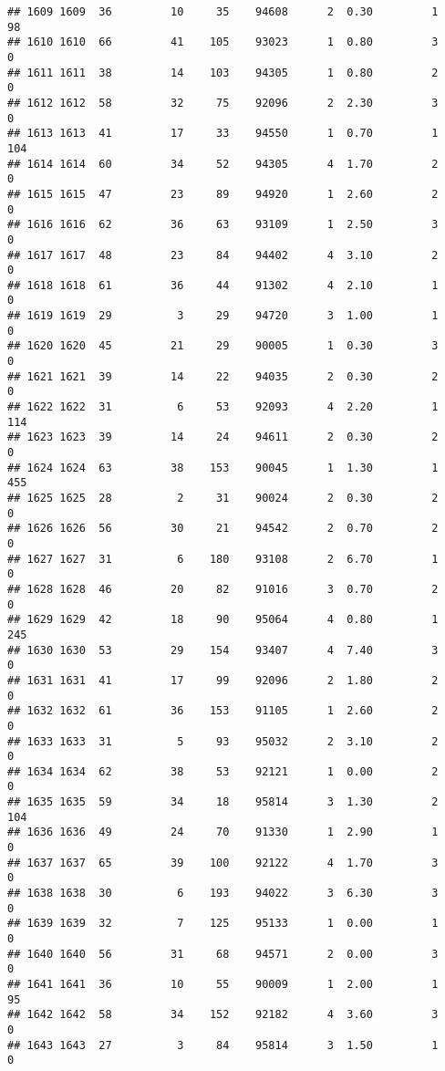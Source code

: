 \documentclass[
]{article}
\begin{document}
\begin{verbatim}
## 1609 1609  36         10     35    94608      2  0.30         1       98
## 1610 1610  66         41    105    93023      1  0.80         3        0
## 1611 1611  38         14    103    94305      1  0.80         2        0
## 1612 1612  58         32     75    92096      2  2.30         3        0
## 1613 1613  41         17     33    94550      1  0.70         1      104
## 1614 1614  60         34     52    94305      4  1.70         2        0
## 1615 1615  47         23     89    94920      1  2.60         2        0
## 1616 1616  62         36     63    93109      1  2.50         3        0
## 1617 1617  48         23     84    94402      4  3.10         2        0
## 1618 1618  61         36     44    91302      4  2.10         1        0
## 1619 1619  29          3     29    94720      3  1.00         1        0
## 1620 1620  45         21     29    90005      1  0.30         3        0
## 1621 1621  39         14     22    94035      2  0.30         2        0
## 1622 1622  31          6     53    92093      4  2.20         1      114
## 1623 1623  39         14     24    94611      2  0.30         2        0
## 1624 1624  63         38    153    90045      1  1.30         1      455
## 1625 1625  28          2     31    90024      2  0.30         2        0
## 1626 1626  56         30     21    94542      2  0.70         2        0
## 1627 1627  31          6    180    93108      2  6.70         1        0
## 1628 1628  46         20     82    91016      3  0.70         2        0
## 1629 1629  42         18     90    95064      4  0.80         1      245
## 1630 1630  53         29    154    93407      4  7.40         3        0
## 1631 1631  41         17     99    92096      2  1.80         2        0
## 1632 1632  61         36    153    91105      1  2.60         2        0
## 1633 1633  31          5     93    95032      2  3.10         2        0
## 1634 1634  62         38     53    92121      1  0.00         2        0
## 1635 1635  59         34     18    95814      3  1.30         2      104
## 1636 1636  49         24     70    91330      1  2.90         1        0
## 1637 1637  65         39    100    92122      4  1.70         3        0
## 1638 1638  30          6    193    94022      3  6.30         3        0
## 1639 1639  32          7    125    95133      1  0.00         1        0
## 1640 1640  56         31     68    94571      2  0.00         3        0
## 1641 1641  36         10     55    90009      1  2.00         1       95
## 1642 1642  58         34    152    92182      4  3.60         3        0
## 1643 1643  27          3     84    95814      3  1.50         1        0

\end{verbatim}
\end{document}
